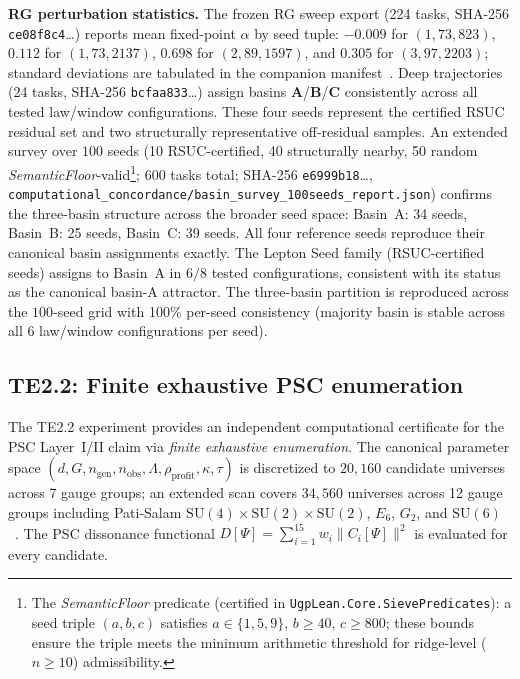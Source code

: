 \documentclass[11pt,twocolumn]{article}
\theoremstyle{remark}
\begin{document}
\begin{table}[t]
  \centering
  \scriptsize
  \caption{Master concordance excerpt (auto-generated from the companion CSV).}
  \label{tab:concordance}
  \resizebox{\textwidth}{!}{}
\end{table}

\noindent\textbf{RG perturbation statistics.}
The frozen RG sweep export (224 tasks, SHA-256 \texttt{ce08f8c4}\ldots) reports mean fixed-point
$\alpha$ by seed tuple: $-0.009$ for $(1,73,823)$, $0.112$ for $(1,73,2137)$,
$0.698$ for $(2,89,1597)$, and $0.305$ for $(3,97,2203)$; standard deviations are tabulated
in the companion manifest~\cite{ugp-physics-repo}.
Deep trajectories (24 tasks, SHA-256 \texttt{bcfaa833}\ldots) assign basins \textbf{A}/\textbf{B}/\textbf{C}
consistently across all tested law/window configurations.
These four seeds represent the certified RSUC residual set and two structurally
representative off-residual samples.
An extended survey over $100$ seeds (10 RSUC-certified, 40 structurally nearby,
50 random \emph{SemanticFloor}-valid\footnote{The \emph{SemanticFloor} predicate (certified in \texttt{UgpLean.Core.SievePredicates}): a seed triple $(a,b,c)$ satisfies $a\in\{1,5,9\}$, $b\ge 40$, $c\ge 800$; these bounds ensure the triple meets the minimum arithmetic threshold for ridge-level ($n\ge 10$) admissibility.};
600 tasks total; SHA-256 \texttt{e6999b18}\ldots,
\texttt{computational\_concordance/\allowbreak{}basin\_survey\_100seeds\_report.json})
confirms the three-basin structure across the broader seed space:
Basin~A: 34 seeds, Basin~B: 25 seeds, Basin~C: 39 seeds.
All four reference seeds reproduce their canonical basin assignments exactly.
The Lepton Seed family (RSUC-certified seeds) assigns to Basin~A in $6/8$ tested
configurations, consistent with its status as the canonical basin-A attractor.
The three-basin partition is reproduced across the $100$-seed grid with
100\% per-seed consistency (majority basin is stable across all 6
law/window configurations per seed).

\subsection{TE2.2: Finite exhaustive PSC enumeration}
\label{sec:te22}

The TE2.2 experiment provides an independent computational certificate for the PSC Layer~I/II
claim via \emph{finite exhaustive enumeration}.
The canonical parameter space $(d, G, n_{\mathrm{gen}}, n_{\mathrm{obs}}, \Lambda, \rho_{\mathrm{profit}},
\kappa, \tau)$ is discretized to $20{,}160$ candidate universes across 7 gauge groups; an extended scan
covers $34{,}560$ universes across 12 gauge groups including Pati-Salam
$\mathrm{SU}(4)\times\mathrm{SU}(2)\times\mathrm{SU}(2)$, $E_6$, $G_2$, and $\mathrm{SU}(6)$~\cite{SpivackPSCConcordance}.
The PSC dissonance functional $D[\Psi] = \sum_{i=1}^{15} w_i \|C_i[\Psi]\|^2$ is evaluated for every candidate.
\end{document}
